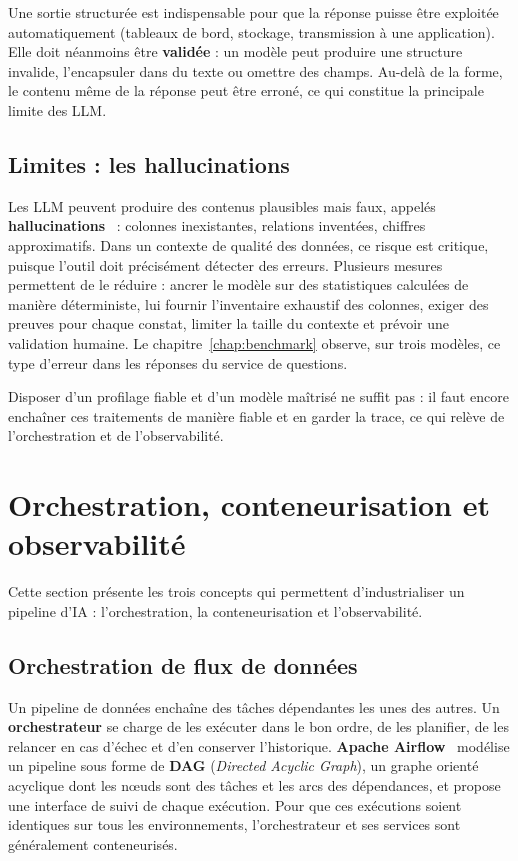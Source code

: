 Une sortie structurée est indispensable pour que la réponse puisse être exploitée automatiquement (tableaux de bord, stockage, transmission à une application). Elle doit néanmoins être \textbf{validée} : un modèle peut produire une structure invalide, l'encapsuler dans du texte ou omettre des champs. Au-delà de la forme, le contenu même de la réponse peut être erroné, ce qui constitue la principale limite des LLM.

\subsection{Limites : les hallucinations}

Les LLM peuvent produire des contenus plausibles mais faux, appelés \textbf{hallucinations}~\cite{ji} : colonnes inexistantes, relations inventées, chiffres approximatifs. Dans un contexte de qualité des données, ce risque est critique, puisque l'outil doit précisément détecter des erreurs. Plusieurs mesures permettent de le réduire : ancrer le modèle sur des statistiques calculées de manière déterministe, lui fournir l'inventaire exhaustif des colonnes, exiger des preuves pour chaque constat, limiter la taille du contexte et prévoir une validation humaine. Le chapitre~\ref{chap:benchmark} observe, sur trois modèles, ce type d'erreur dans les réponses du service de questions.

Disposer d'un profilage fiable et d'un modèle maîtrisé ne suffit pas : il faut encore enchaîner ces traitements de manière fiable et en garder la trace, ce qui relève de l'orchestration et de l'observabilité.

\section{Orchestration, conteneurisation et observabilité}

Cette section présente les trois concepts qui permettent d'industrialiser un pipeline d'IA : l'orchestration, la conteneurisation et l'observabilité.

\subsection{Orchestration de flux de données}

Un pipeline de données enchaîne des tâches dépendantes les unes des autres. Un \textbf{orchestrateur} se charge de les exécuter dans le bon ordre, de les planifier, de les relancer en cas d'échec et d'en conserver l'historique. \textbf{Apache Airflow}~\cite{airflow} modélise un pipeline sous forme de \textbf{DAG} (\textit{Directed Acyclic Graph}), un graphe orienté acyclique dont les nœuds sont des tâches et les arcs des dépendances, et propose une interface de suivi de chaque exécution. Pour que ces exécutions soient identiques sur tous les environnements, l'orchestrateur et ses services sont généralement conteneurisés.

